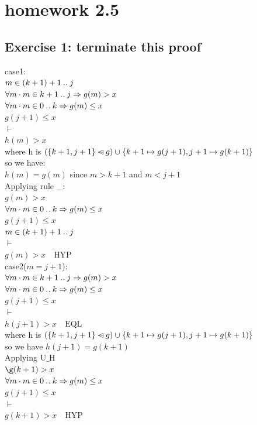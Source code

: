 \documentclass[11pt,a4paper,fleqn]{article}
\begin{document}
\section{homework 2.5}

\subsection{Exercise 1: terminate this proof}
\noindent
case1:\\
$m \in (k + 1)+1 \mathbin{.\mkern1mu.} j$\\
$\forall m \cdot m \in k+1 \mathbin{.\mkern1mu.} j \Rightarrow g(m) > x  $\\
$\forall m \cdot m \in 0 \mathbin{.\mkern1mu.} k \Rightarrow g(m) \leq x $\\
$g(j+1) \leq x $\\
$\vdash$\\
$h(m)>x $\\

\noindent
where h is $ (\{k+1, j+1\} \mathbin{\lhd\mkern-14mu-} g) \cup\{k+1 \mapsto g(j+1), j+1 \mapsto g(k+1)\}$\\
\noindent so we have:\\
$h(m) = g(m)$ since $m>k+1 $ and $m<j+1$\\ 
\noindent Applying rule \_:\\
$g(m)>x $\\
$ \forall m \cdot m \in 0 \mathbin{.\mkern1mu.} k \Rightarrow g(m) \leq x $\\
$g(j+1) \leq x $\\
$m \in (k + 1)+1 \mathbin{.\mkern1mu.} j$\\
$\vdash$\\
$g(m)>x \quad \text{HYP}$\\

\noindent
case2($m = j+1 $):\\
$\forall m \cdot m \in k+1 \mathbin{.\mkern1mu.} j \Rightarrow g(m) > x  $\\
$\forall m \cdot m \in 0 \mathbin{.\mkern1mu.} k \Rightarrow g(m) \leq x $\\
$g(j+1) \leq x $\\
$ \vdash$ \\
$h(j+1)>x \quad \text{EQL} $\\
\noindent
where h is $ (\{k+1, j+1\} \mathbin{\lhd\mkern-14mu-} g) \cup\{k+1 \mapsto g(j+1), j+1 \mapsto g(k+1)\}$\\
\noindent so we have $h(j+1)=g(k+1)$\\
\noindent Applying $\text{U}\text{\_}\text{H}$\\
$\g(k+1) > x  $\\
$\forall m \cdot m \in 0 \mathbin{.\mkern1mu.} k \Rightarrow g(m) \leq x $\\
$g(j+1) \leq x $\\
$ \vdash$ \\
$g(k+1)>x \quad \text{HYP} $\\
\end{document}
